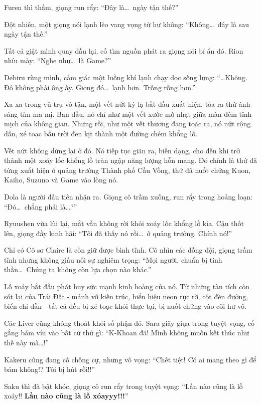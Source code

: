 \documentclass[../main.tex]{subfiles}
\begin{document}
Furen thì thầm, giọng run rẩy: ``Đây là\dots\ ngày tận thế?''

Đột nhiên, một giọng nói lạnh lẽo vang vọng từ hư không: ``Không\dots\ đây là sau ngày tận thế.''

Tất cả giật mình quay đầu lại, cố tìm nguồn phát ra giọng nói bí ẩn đó. Rion nhíu mày: ``Nghe như\dots\ là Game?''

Debiru rùng mình, cảm giác một luồng khí lạnh chạy dọc sống lưng: ``\dots Không. Đó không phải ông ấy. Giọng đó\dots\ lạnh hơn. Trống rỗng hơn.''

Xa xa trong vũ trụ vô tận, một vết nứt kỳ lạ bắt đầu xuất hiện, tỏa ra thứ ánh sáng tím ma mị. Ban đầu, nó chỉ như một vết xước mờ nhạt giữa màn đêm tĩnh mịch của không gian. Nhưng rồi, như một vết thương đang toác ra, nó nứt rộng dần, xé toạc bầu trời đen kịt thành một đường chém khổng lồ.

Vết nứt không dừng lại ở đó. Nó tiếp tục giãn ra, biến dạng, cho đến khi trở thành một xoáy lốc khổng lồ tràn ngập năng lượng hỗn mang. Đó chính là thứ đã từng xuất hiện ở quảng trường Thành phố Cầu Vồng, thứ đã nuốt chửng Kuon, Kaiho, Suzuno và Game vào lòng nó.

Dola là người đầu tiên nhận ra. Giọng cô trầm xuống, run rẩy trong hoảng loạn: ``Đó\dots\ chẳng phải là\dots?''

Ryuushen vừa lùi lại, mắt vẫn không rời khỏi xoáy lốc khổng lồ kia. Cậu thốt lên, giọng đầy kinh hãi: ``Tôi đã thấy nó rồi\dots\ ở quảng trường. Chính nó!''

Chỉ có Cô sơ Claire là còn giữ được bình tĩnh. Cô nhìn các đồng đội, giọng trầm tĩnh nhưng không giấu nổi sự nghiêm trọng: ``Mọi người, chuẩn bị tinh thần\dots\ Chúng ta không còn lựa chọn nào khác.''

Lỗ xoáy bắt đầu phát huy sức mạnh kinh hoàng của nó. Từ những tàn tích còn sót lại của Trái Đất - mảnh vỡ kiến trúc, biển hiệu neon rực rỡ, cột đèn đường, biển chỉ dẫn - tất cả đều bị xé toạc khỏi thực tại, bị nuốt chửng vào cõi hư vô.

Các Liver cũng không thoát khỏi số phận đó. Sara giãy giụa trong tuyệt vọng, cố gắng bám víu vào bất cứ thứ gì: ``K-Khoan đã! Mình không muốn kết thúc như thế này mà\dots!''

Kakeru cũng đang cố chống cự, nhưng vô vọng: ``Chết tiệt! Có ai mang theo gì để bám không!? Tôi bị hút rồi!!''

Saku thì đã bật khóc, giọng cô run rẩy trong tuyệt vọng: ``Lần nào cũng là lỗ xoáy!! \textbf{Lần nào cũng là lỗ xóayyy!!!}''
\end{document}
